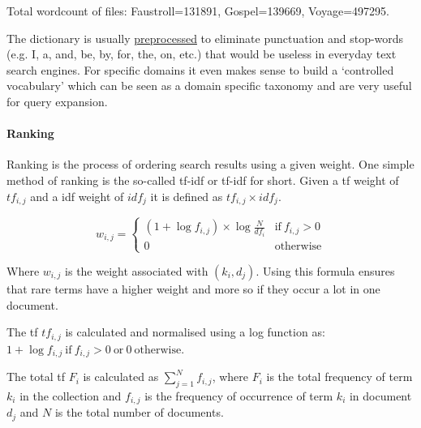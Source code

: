 Total wordcount of files: Faustroll=131891, Gospel=139669, Voyage=497295.

The dictionary is usually \hyperlink{stemming}{preprocessed} to eliminate punctuation and stop-words (e.g. I, a, and, be, by, for, the, on, etc.) that would be useless in everyday text search engines. For specific domains it even makes sense to build a `controlled vocabulary' which can be seen as a domain specific taxonomy and are very useful for query expansion.

%
%
%


\paragraph{Ranking}

Ranking is the process of ordering search results using a given weight. One simple method of ranking is the so-called \acrlong{tf}-\acrlong{idf} or \acrshort{tf}-\acrshort{idf} for short. Given a \gls{tf} weight of $tf_{i,j}$ and a \gls{idf} weight of $idf_j$ it is defined as $tf_{i,j}\times idf_j$.

\begin{equation}
  w_{i,j} =
  \begin{cases}
  (1+\log f_{i,j})\times \log\frac{N}{df_i} & \text{if} \ f_{i,j} > 0 \\
  0 & \text{otherwise}
  \end{cases}
  \label{eq:wij}
\end{equation}

Where $w_{i,j}$ is the weight associated with $(k_i,d_j)$. Using this formula ensures that rare terms have a higher weight and more so if they occur a lot in one document.

The \gls{tf} $tf_{i,j}$ is calculated and normalised using a log function as:
$1+\log f_{i,j} \ \text{if} \ f_{i,j} > 0 \ \text{or} \ 0 \ \text{otherwise}$.

The total \gls{tf} $F_i$ is calculated as $\sum_{j=1}^{N}f_{i,j}$, where $F_i$ is the total frequency of term $k_i$ in the collection and $f_{i,j}$ is the frequency of occurrence of term $k_i$ in document $d_j$ and $N$ is the total number of documents.

